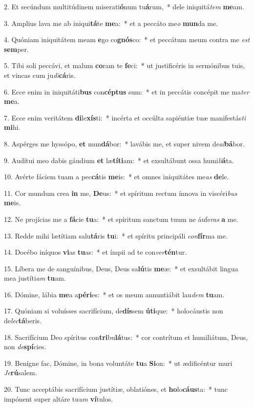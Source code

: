 2. Et secúndum multitúdinem miserati\textbf{ó}num tu\textbf{á}rum,~*  dele iniquitá\textit{tem} \textbf{me}am.\

3. Amplius lava me ab iniqui\textbf{tá}te \textbf{me}a:~*  et a peccáto me\textit{o} \textbf{mun}da me.\

4. Quóniam iniquitátem meam \textbf{e}go co\textbf{gnós}co:~*  et peccátum meum contra me \textit{est} \textbf{sem}per.\

5. Tibi soli peccávi, et malum \textbf{co}ram te \textbf{fe}ci:~*  ut justificéris in sermónibus tuis, et vincas cum ju\textit{di}\textbf{cá}ris.\

6. Ecce enim in iniquitáti\textbf{bus} con\textbf{cép}\textbf{tus} sum:~*  et in peccátis concépit me ma\textit{ter} \textbf{me}a.\

7. Ecce enim veritátem \textbf{di}le\textbf{xís}ti:~*  incérta et occúlta sapiéntiæ tuæ manifestás\textit{ti} \textbf{mi}hi.\

8. Aspérges me hyssópo, \textbf{et} mun\textbf{dá}bor:~*  lavábis me, et super nivem de\textit{al}\textbf{bá}bor.\

9. Audítui meo dabis gáudium \textbf{et} læ\textbf{tí}\textbf{ti}am:~*  et exsultábunt ossa humi\textit{li}\textbf{á}ta.\

10. Avérte fáciem tuam a pec\textbf{cá}tis \textbf{me}is:~*  et omnes iniquitátes me\textit{as} \textbf{de}le.\

11. Cor mundum crea \textbf{in} me, \textbf{De}us:~*  et spíritum rectum ínnova in viscéri\textit{bus} \textbf{me}is.\

12. Ne projícias me a \textbf{fá}cie \textbf{tu}a:~*  et spíritum sanctum tuum ne áufe\textit{ras} \textbf{a} me.\

13. Redde mihi lætítiam salu\textbf{tá}ris \textbf{tu}i:~*  et spíritu principáli \textit{con}\textbf{fír}ma me.\

14. Docébo iníquos \textbf{vi}as \textbf{tu}as:~*  et ímpii ad te con\textit{ver}\textbf{tén}tur.\

15. Líbera me de sanguínibus, Deus, Deus sa\textbf{lú}tis \textbf{me}æ:~*  et exsultábit lingua mea justíti\textit{am} \textbf{tu}am.\

16. Dómine, lábia \textbf{me}a a\textbf{pé}\textbf{ri}es:~*  et os meum annuntiábit lau\textit{dem} \textbf{tu}am.\

17. Quóniam si voluísses sacrifícium, de\textbf{dís}sem \textbf{ú}\textbf{ti}que:~*  holocáustis non de\textit{lec}\textbf{tá}beris.\

18. Sacrifícium Deo spíritus con\textbf{tri}bu\textbf{lá}tus:~*  cor contrítum et humiliátum, Deus, non \textit{de}\textbf{spí}cies.\

19. Benígne fac, Dómine, in bona voluntáte \textbf{tu}a \textbf{Si}on:~*  ut ædificéntur muri \textit{Je}\textbf{rú}salem.\

20. Tunc acceptábis sacrifícium justítiæ, oblatiónes, et \textbf{ho}lo\textbf{cáus}ta:~*  tunc impónent super altáre tu\textit{um} \textbf{ví}tulos.\

